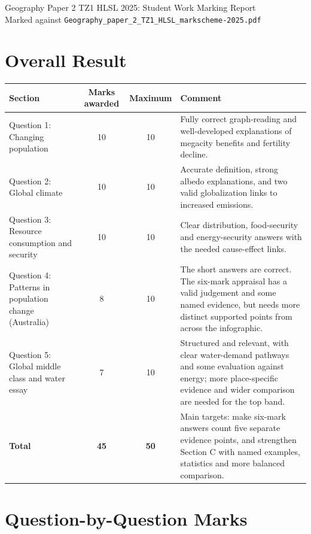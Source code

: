 \documentclass[11pt]{article}
\begin{document}
\begin{center}
  {\Large Geography Paper 2 TZ1 HLSL 2025: Student Work Marking Report}\\[4pt]
  {\normalsize Marked against \texttt{Geography\_paper\_2\_TZ1\_HLSL\_markscheme-2025.pdf}}
\end{center}

\section*{Overall Result}

\begin{tabularx}{\textwidth}{@{}p{} c c Y@{}}
\toprule
Section & Marks awarded & Maximum & Comment \\
\midrule
Question 1: Changing population & 10 & 10 & Fully correct graph-reading and well-developed explanations of megacity benefits and fertility decline. \\
Question 2: Global climate & 10 & 10 & Accurate definition, strong albedo explanations, and two valid globalization links to increased emissions. \\
Question 3: Resource consumption and security & 10 & 10 & Clear distribution, food-security and energy-security answers with the needed cause-effect links. \\
Question 4: Patterns in population change (Australia) & 8 & 10 & The short answers are correct. The six-mark appraisal has a valid judgement and some named evidence, but needs more distinct supported points from across the infographic. \\
Question 5: Global middle class and water essay & 7 & 10 & Structured and relevant, with clear water-demand pathways and some evaluation against energy; more place-specific evidence and wider comparison are needed for the top band. \\
\midrule
\textbf{Total} & \textbf{45} & \textbf{50} & Main targets: make six-mark answers count five separate evidence points, and strengthen Section C with named examples, statistics and more balanced comparison. \\
\bottomrule
\end{tabularx}

\section*{Question-by-Question Marks}
\end{document}
